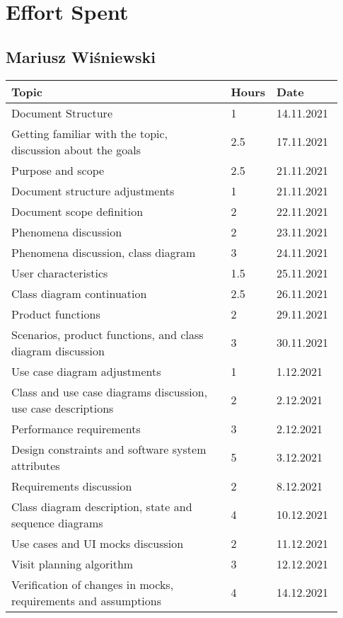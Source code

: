 \chapter{Effort Spent}

\section*{Mariusz Wiśniewski}
\begin{longtable}{@{}p{0.67\linewidth} p{0.06\linewidth} p{0.20\linewidth}@{}}
    \toprule[1.5pt]
    Topic & Hours & Date\\ \hline
    Document Structure & 1 & 14.11.2021\\ 
    Getting familiar with the topic, discussion about the goals & 2.5 & 17.11.2021\\ 
    Purpose and scope & 2.5 & 21.11.2021\\ 
    Document structure adjustments & 1 & 21.11.2021\\
    Document scope definition & 2 & 22.11.2021\\
    Phenomena discussion & 2 & 23.11.2021\\
    Phenomena discussion, class diagram & 3 & 24.11.2021\\ 
    User characteristics & 1.5 & 25.11.2021\\ 
    Class diagram continuation & 2.5 & 26.11.2021 \\ 
    Product functions & 2 & 29.11.2021 \\
    Scenarios, product functions, and class diagram discussion & 3 & 30.11.2021\\
    Use case diagram adjustments & 1 & 1.12.2021\\
    Class and use case diagrams discussion, use case descriptions & 2 & 2.12.2021\\ 
    Performance requirements & 3 & 2.12.2021\\
    Design constraints and software system attributes & 5 & 3.12.2021\\
    Requirements discussion & 2 & 8.12.2021\\
    Class diagram description, state and sequence diagrams & 4 & 10.12.2021\\ 
    Use cases and UI mocks discussion & 2 & 11.12.2021\\
    Visit planning algorithm & 3 & 12.12.2021\\
    Verification of changes in mocks, requirements and assumptions & 4 & 14.12.2021\\

\end{longtable}
